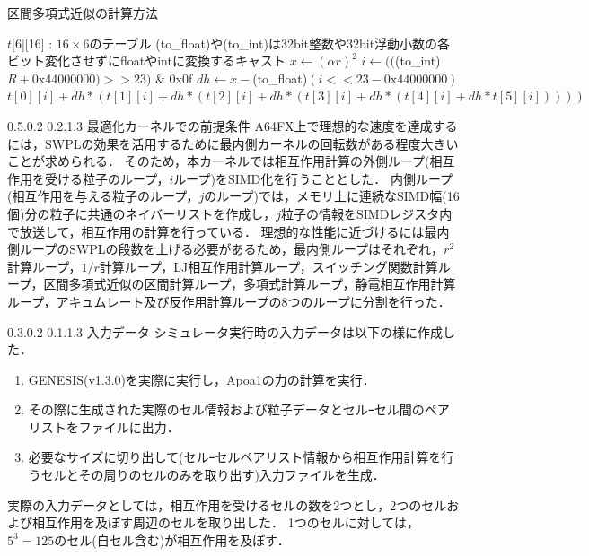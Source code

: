 \documentclass[uplatex,11pt,a4j,titlepage,oneside,openright,dvipdfmx]{jsbook}
\makeatletter
\renewcommand{\section}{%
   \@startsection{section}{1}{\z@}%
   {0.5\Cvs \@plus.0\Cdp \@minus.2\Cdp}%
   {0.2\Cvs \@plus.1\Cdp \@minus.3\Cdp}%
   {\reset@font\large\bfseries}}%
\renewcommand{\subsection}{%
   \@startsection{subsection}{1}{\z@}%
   {0.3\Cvs \@plus.0\Cdp \@minus.2\Cdp}%
   {0.1\Cvs \@plus.1\Cdp \@minus.3\Cdp}%
   {\reset@font\large\bfseries}}%
\makeatother
\begin{document}
\begin{algorithm}
 \caption{区間多項式近似の計算方法} \label{algo:PPA} %
 \begin{algorithmic}
  \Require
  \State $t$[6][16] : $16 \times 6$のテーブル
  \State (to\_float)や(to\_int)は32bit整数や32bit浮動小数の各ビット変化させずにfloatやintに変換するキャスト
   $x  \leftarrow (\alpha r)^2$
   $i  \leftarrow (($(to\_int)$R+$0x44000000$) >> 23)$ \& 0x0f
   $dh \leftarrow x - $(to\_float)$(i<<23 - \mathrm{0x44000000})$
   \Return $t[0][i] + dh*(t[1][i]+ dh*(t[2][i] + dh*(t[3][i] + dh*(t[4][i] + dh*t[5][i]))))$
  \EndFunction
 \end{algorithmic}
\end{algorithm}

\section{最適化カーネルでの前提条件}
A64FX上で理想的な速度を達成するには，SWPLの効果を活用するために最内側カーネルの回転数がある程度大きいことが求められる．
そのため，本カーネルでは相互作用計算の外側ループ(相互作用を受ける粒子のループ，$i$ループ)をSIMD化を行うこととした．
内側ループ(相互作用を与える粒子のループ，$j$のループ)では，メモリ上に連続なSIMD幅(16個)分の粒子に共通のネイバーリストを作成し，$j$粒子の情報をSIMDレジスタ内で放送して，相互作用の計算を行っている．
理想的な性能に近づけるには最内側ループのSWPLの段数を上げる必要があるため，最内側ループはそれぞれ，$r^2$計算ループ，$1/r$計算ループ，LJ相互作用計算ループ，スイッチング関数計算ループ，区間多項式近似の区間計算ループ，多項式計算ループ，静電相互作用計算ループ，アキュムレート及び反作用計算ループの8つのループに分割を行った．

\subsection{入力データ}
シミュレータ実行時の入力データは以下の様に作成した．
\begin{enumerate}
 \item GENESIS(v1.3.0)を実際に実行し，Apoa1の力の計算を実行．
 \item その際に生成された実際のセル情報および粒子データとセルｰセル間のペアリストをファイルに出力．
 \item 必要なサイズに切り出して(セルｰセルペアリスト情報から相互作用計算を行うセルとその周りのセルのみを取り出す)入力ファイルを生成．
\end{enumerate}
実際の入力データとしては，相互作用を受けるセルの数を2つとし，2つのセルおよび相互作用を及ぼす周辺のセルを取り出した．
1つのセルに対しては，$5^3 = 125$のセル(自セル含む)が相互作用を及ぼす．
\end{document}

